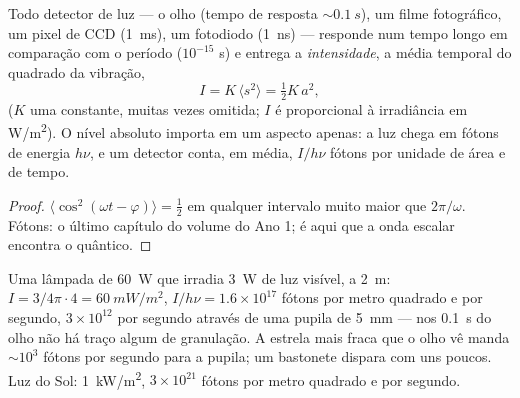 \begin{proposition}\label{prop:b2:scalar-light-model:intensity}
Todo detector de luz --- o olho (tempo de resposta $\sim\qty{0.1}{s}$), um
filme fotográfico, um pixel de CCD (\qty{1}{ms}), um fotodiodo (\qty{1}{ns}) ---
responde num tempo longo em comparação com o período ($10^{-15}$ s) e
entrega a \emph{intensidade}, a média temporal do quadrado da
vibração,
\[
I = K\,\langle s^2\rangle = \tfrac12K\,a^2 ,
\]
($K$ uma constante, muitas vezes omitida; $I$ é proporcional à irradiância
em \unit{W/m^2}). O nível absoluto importa em um aspecto apenas: a luz
chega em fótons de energia $h\nu$, e um detector conta, em média,
$I/h\nu$ fótons por unidade de área e de tempo.
\end{proposition}

\begin{proof}
$\langle\cos^2(\omega t - \varphi)\rangle = \tfrac12$ em qualquer intervalo muito maior
que $2\pi/\omega$. Fótons: o último capítulo do volume do Ano 1; é aqui
que a onda escalar encontra o quântico.
\end{proof}

\begin{example}\label{ex:b2:scalar-light-model:orders}
Uma lâmpada de \qty{60}{W} que irradia \qty{3}{W} de luz visível, a \qty{2}{m}:
$I = 3/4\pi\cdot4 = \qty{60}{mW/m^2}$, $I/h\nu = 1.6 \times 10^{17}$ fótons por metro
quadrado e por segundo, $3 \times 10^{12}$ por segundo através de uma pupila de \qty{5}{mm} ---
nos \qty{0.1}{s} do olho não há traço algum de granulação. A
estrela mais fraca que o olho vê manda $\sim 10^3$ fótons por segundo para a
pupila; um bastonete dispara com uns poucos. Luz do Sol: \qty{1}{kW/m^2}, $3 \times 10^{21}$
fótons por metro quadrado e por segundo.
\end{example}

